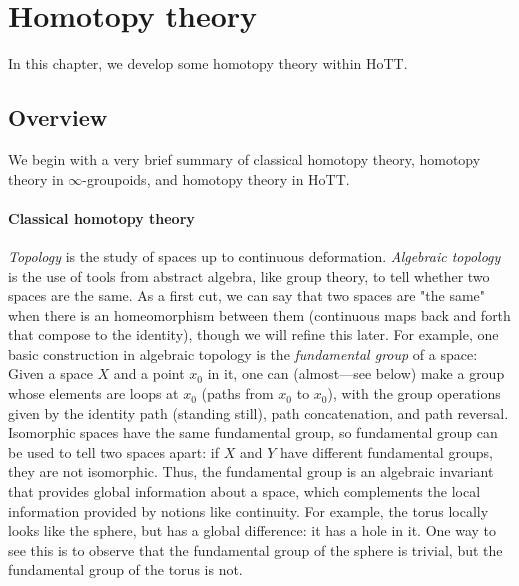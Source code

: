 
\newcommand{\anhprop}{a mere proposition\xspace}
\newcommand{\hprops}{mere propositions\xspace}


\renewcommand{\P}{\ensuremath{\mathsf{P}}\xspace}
\newcommand{\reflect}{\mathsf{r}}
\newcommand{\project}{\mathsf{p}}
\newcommand{\ext}{\mathsf{ext}}

\chapter{Homotopy theory}
\label{cha:homotopy}

In this chapter, we develop some homotopy theory within HoTT.  

\section{Overview}

We begin with a very brief summary of classical homotopy theory,
homotopy theory in $\infty$-groupoids, and homotopy theory in HoTT.

\subsubsection{Classical homotopy theory}

\emph{Topology} is the study of spaces up to continuous deformation.
\emph{Algebraic topology} is the use of tools from abstract algebra,
like group theory, to tell whether two spaces are the same.  As a first
cut, we can say that two spaces are "the same" when there is an
homeomorphism between them (continuous maps back and forth that compose to
the identity), though we will refine this later.  For example, one basic
construction in algebraic topology is the \emph{fundamental group} of a
space: Given a space $X$ and a point $x_0$ in it, one can (almost---see
below) make a group whose elements are loops at $x_0$ (paths from $x_0$
to $x_0$), with the group operations given by the identity path
(standing still), path concatenation, and path reversal.  Isomorphic
spaces have the same fundamental group, so fundamental group can be used
to tell two spaces apart: if $X$ and $Y$ have different fundamental
groups, they are not isomorphic.  Thus, the fundamental group is an
algebraic invariant that provides global information about a space,
which complements the local information provided by notions like
continuity.  For example, the torus locally looks like the sphere, but
has a global difference: it has a hole in it.  One way to see this is to
observe that the fundamental group of the sphere is trivial, but the
fundamental group of the torus is not.

